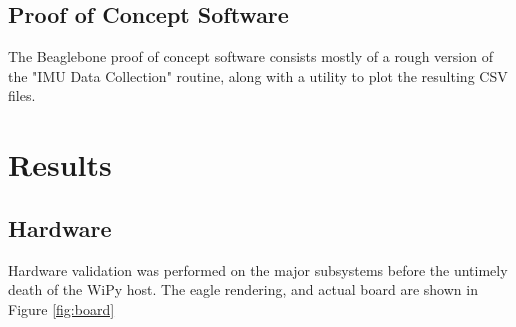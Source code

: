 \documentclass[11pt,oneside]{amsart}
\begin{document}
\subsection{Proof of Concept Software}
The Beaglebone proof of concept software consists mostly of a rough version of the "IMU Data Collection" routine, along with a utility to plot the resulting CSV files. 

\section{Results}
\subsection{Hardware}
Hardware validation was performed on the major subsystems before the untimely death of the WiPy host. The eagle rendering, and actual board are shown in Figure \ref{fig:board}
\end{document}
